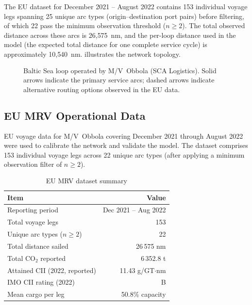 The EU \MRV{} dataset for December 2021 -- August 2022 contains 153
individual voyage legs spanning 25 unique arc types (origin--destination
port pairs) before filtering, of which 22 pass the minimum observation
threshold ($n \geq 2$).  The total observed distance across these arcs
is 26{,}575~nm, and the per-loop distance used in the model
(the expected total distance for one complete service cycle)
is approximately 10{,}540~nm.   illustrates the
network topology.

\begin{figure}[h]
  \centering
  \caption{Baltic Sea loop operated by M/V~Obbola (SCA Logistics).
           Solid arrows indicate the primary service arcs; dashed arrows
           indicate alternative routing options observed in the EU \MRV{} data.}
  \label{fig:route_map}
\end{figure}

\subsection{EU MRV Operational Data}
\label{sec:case:mrv}

EU \MRV{} voyage data for M/V~Obbola covering December 2021 through
August 2022 were used to calibrate the network and validate the model.
The dataset comprises 153 individual voyage legs across 22 unique arc
types (after applying a minimum observation filter of $n \geq 2$).

\begin{table}[h]
\centering
\caption{EU MRV dataset summary}
\label{tab:mrv_summary}
\begin{tabular}{lr}
  \toprule
  Item & Value \\
  \midrule
  Reporting period & Dec 2021 -- Aug 2022 \\
  Total voyage legs & 153 \\
  Unique arc types ($n \geq 2$) & 22 \\
  Total distance sailed & 26\,575 nm \\
  Total CO$_2$ reported & 6\,352.8 t \\
  Attained CII (2022, reported) & 11.43 g/GT$\cdot$nm \\
  IMO CII rating (2022) & B \\
  Mean cargo per leg & 50.8\% capacity \\
  \bottomrule
\end{tabular}
\end{table}

